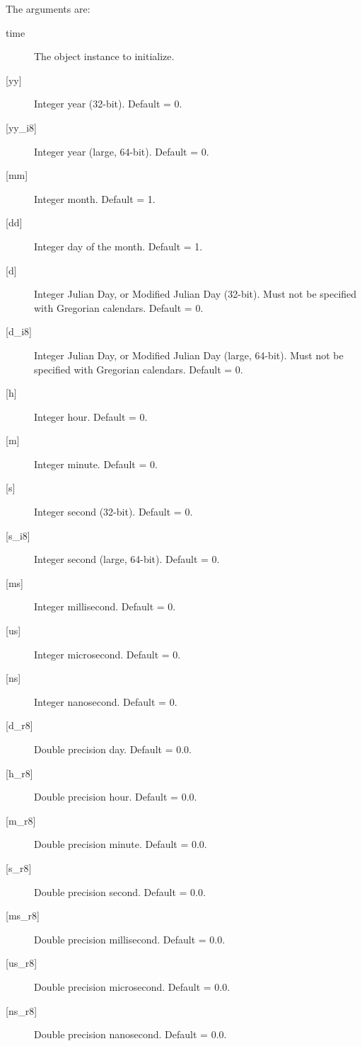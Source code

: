        The arguments are:
       \begin{description}
       \item[time]
            The object instance to initialize.
       \item[{[yy]}]
            Integer year (32-bit).  Default = 0.
       \item[{[yy\_i8]}]
            Integer year (large, 64-bit).  Default = 0.
       \item[{[mm]}]
            Integer month.  Default = 1.
       \item[{[dd]}]
            Integer day of the month.  Default = 1.
       \item[{[d]}]
            Integer Julian Day, or Modified Julian Day (32-bit).  Must not be
            specified with Gregorian calendars.  Default = 0.
       \item[{[d\_i8]}]
            Integer Julian Day, or Modified Julian Day (large, 64-bit).  Must not be
            specified with Gregorian calendars.  Default = 0.
       \item[{[h]}]
            Integer hour.  Default = 0.
       \item[{[m]}]
            Integer minute.  Default = 0.
       \item[{[s]}]
            Integer second (32-bit).  Default = 0.
       \item[{[s\_i8]}]
            Integer second (large, 64-bit).  Default = 0.
       \item[{[ms]}]
            Integer millisecond.  Default = 0.
       \item[{[us]}]
            Integer microsecond.  Default = 0.
       \item[{[ns]}]
            Integer nanosecond.  Default = 0.
       \item[{[d\_r8]}]
            Double precision day.  Default = 0.0.
       \item[{[h\_r8]}]
            Double precision hour.  Default = 0.0.
       \item[{[m\_r8]}]
            Double precision minute.  Default = 0.0.
       \item[{[s\_r8]}]
            Double precision second.  Default = 0.0.
       \item[{[ms\_r8]}]
            Double precision millisecond.  Default = 0.0.
       \item[{[us\_r8]}]
            Double precision microsecond.  Default = 0.0.
       \item[{[ns\_r8]}]
            Double precision nanosecond.  Default = 0.0.

\end{description}
